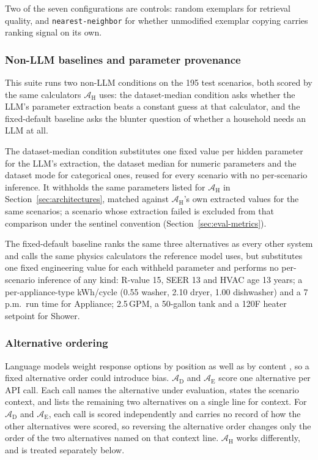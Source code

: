 \documentclass[final,3p,times]{elsarticle}
\begin{document}
Two of the seven configurations are controls: random exemplars for retrieval quality, and \texttt{nearest-neighbor} for whether unmodified exemplar copying carries ranking signal on its own.

\subsubsection{Non-LLM baselines and parameter provenance}
\label{sec:hybrid-ablation-methods}
This suite runs two non-LLM conditions on the 195 test scenarios, both scored by the same calculators $\mathcal{A}_{\text{H}}$ uses: the dataset-median condition asks whether the LLM's parameter extraction beats a constant guess at that calculator, and the fixed-default baseline asks the blunter question of whether a household needs an LLM at all.

The dataset-median condition substitutes one fixed value per hidden parameter for the LLM's extraction, the dataset median for numeric parameters and the dataset mode for categorical ones, reused for every scenario with no per-scenario inference. It withholds the same parameters listed for $\mathcal{A}_{\text{H}}$ in Section~\ref{sec:architectures}, matched against $\mathcal{A}_{\text{H}}$'s own extracted values for the same scenarios; a scenario whose extraction failed is excluded from that comparison under the sentinel convention (Section~\ref{sec:eval-metrics}).

The fixed-default baseline ranks the same three alternatives as every other system and calls the same physics calculators the reference model uses, but substitutes one fixed engineering value for each withheld parameter and performs no per-scenario inference of any kind: R-value 15, SEER 13 and HVAC age 13 years; a per-appliance-type kWh/cycle (0.55 washer, 2.10 dryer, 1.00 dishwasher) and a 7\,p.m.\ run time for Appliance; 2.5\,GPM, a 50-gallon tank and a 120\textdegree{}F heater setpoint for Shower.

\FloatBarrier
\subsubsection{Alternative ordering}
\label{sec:alternative-order}

Language models weight response options by position as well as by content \cite{wang2024fairescalers,zheng2023judging}, so a fixed alternative order could introduce bias. $\mathcal{A}_{\text{D}}$ and $\mathcal{A}_{\text{E}}$ score one alternative per API call. Each call names the alternative under evaluation, states the scenario context, and lists the remaining two alternatives on a single line for context. For $\mathcal{A}_{\text{D}}$ and $\mathcal{A}_{\text{E}}$, each call is scored independently and carries no record of how the other alternatives were scored, so reversing the alternative order changes only the order of the two alternatives named on that context line. $\mathcal{A}_{\text{H}}$ works differently, and is treated separately below.
\end{document}

